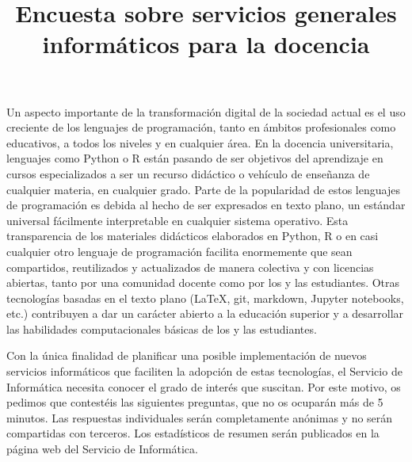 \documentclass[a4paper,12pt]{article}
\title{Encuesta sobre servicios generales informáticos para la docencia}
\begin{document}
\maketitle
Un aspecto importante de la transformación digital de la sociedad actual es el uso creciente
de los lenguajes de programación, tanto en ámbitos profesionales como educativos, a todos
los niveles y en cualquier área. En la docencia universitaria, lenguajes como Python o R
están pasando de ser objetivos del aprendizaje en cursos especializados a ser un recurso
didáctico o vehículo de enseñanza de cualquier materia, en cualquier grado. Parte de la
popularidad de estos lenguajes de programación es debida al hecho de ser expresados en
texto plano, un estándar universal fácilmente interpretable en cualquier sistema operativo.
Esta transparencia de los materiales didácticos elaborados en Python, R o en casi cualquier
otro lenguaje de programación facilita enormemente que sean compartidos, reutilizados y
actualizados de manera colectiva y con licencias abiertas, tanto por una comunidad docente
como por los y las estudiantes. Otras tecnologías basadas en el texto plano (\LaTeX, git,
markdown, Jupyter notebooks, etc.) contribuyen a dar un carácter abierto a la educación
superior y a desarrollar las habilidades computacionales básicas de los y las estudiantes.

Con la única finalidad de planificar una posible implementación de nuevos servicios
informáticos que faciliten la adopción de estas tecnologías, el Servicio de Informática
necesita conocer el grado de interés que suscitan. Por este motivo, os pedimos que
contestéis las siguientes preguntas, que no os ocuparán más de 5 minutos. Las respuestas
individuales serán completamente anónimas y no serán compartidas con terceros. Los estadísticos
de resumen serán publicados en la página web del Servicio de Informática.
\end{document}
